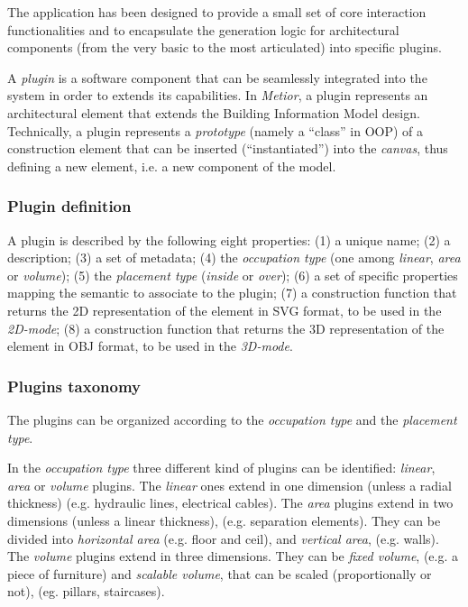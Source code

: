 \noindent The application has been designed to provide a small set of core interaction functionalities and to encapsulate the generation logic for architectural components (from the very basic to the most articulated) into specific plugins.

A \emph{plugin} is a software component that can be seamlessly integrated into the system in order to extends its capabilities.
In \emph{Metior}, a plugin represents an architectural element that extends the Building Information Model design.
Technically, a plugin represents a \emph{prototype} (namely a ``class'' in OOP) of a construction element that can be inserted (``instantiated'') into the \emph{canvas}, thus defining a new element, i.e. a new component of the model.

\subsubsection{Plugin definition}

A plugin is described by the following eight properties: (1) a unique name; (2) a description; (3) a set of metadata; (4) the \emph{occupation type} (one among \emph{linear}, \emph{area} or \emph{volume}); (5) the \emph{placement type} (\emph{inside} or \emph{over}); (6) a set of specific properties mapping the semantic to associate to the plugin; (7) a construction function that returns the 2D representation of the element in SVG format, to be used in the \emph{2D-mode}; (8) a construction function that returns the 3D representation of the element in OBJ format, to be used in the \emph{3D-mode}.

\subsubsection{Plugins taxonomy}\label{ssec:taxonomy}

\noindent The plugins can be organized according to the \emph{occupation type} and the \emph{placement type}. 

In the \emph{occupation type} three different kind of plugins can be identified: \emph{linear}, \emph{area} or \emph{volume} plugins.
The \emph{linear} ones extend in one dimension (unless a radial thickness) (e.g. hydraulic lines, electrical cables). The \emph{area} plugins extend in two dimensions (unless a linear thickness), (e.g. separation elements). They can be divided into \emph{horizontal area} (e.g. floor and ceil), and \emph{vertical area}, (e.g. walls). The \emph{volume} plugins extend in three dimensions. They can be \emph{fixed volume}, (e.g. a piece of furniture) and \emph{scalable volume}, that can be scaled (proportionally or not), (eg. pillars, staircases).

